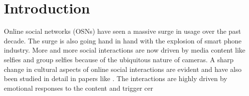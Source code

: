 \section{Introduction}
Online social networks (OSNs) have seen a massive surge in usage over the past decade. The surge is also going hand in hand with the explosion of smart phone industry. More and more social interactions are now driven by media content like selfies and group selfies because of the ubiquitous nature of cameras. A sharp change in cultural aspects of online social interactions are evident and have also been studied in detail in papers like \cite{Souza2015}. The interactions are highly driven by emotional responses to the content and trigger cer